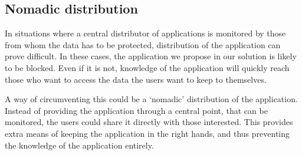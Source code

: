 \subsection{Nomadic distribution}
In situations where a central distributor of applications is monitored by those from whom the data has to be protected, distribution of the application can prove difficult.
In these cases, the application we propose in our solution is likely to be blocked.
Even if it is not, knowledge of the application will quickly reach those who want to access the data the users want to keep to themselves.

A way of circumventing this could be a `nomadic' distribution of the application.
Instead of providing the application through a central point, that can be monitored, the users could share it directly with those interested.
This provides extra means of keeping the application in the right hands, and thus preventing the knowledge of the application entirely.  
